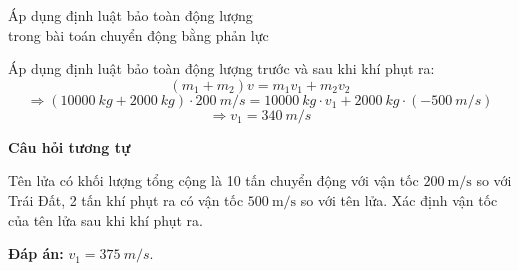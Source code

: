 \begin{dang}{Áp dụng định luật bảo toàn động lượng \\trong bài toán chuyển động bằng phản lực}
{		Áp dụng định luật bảo toàn động lượng trước và sau khi khí phụt ra:
		$$(m_1+m_2)v = m_1v_1 + m_2 v_2$$ $$\Rightarrow (\SI{10000}{kg} + \SI{2000}{kg}) \cdot \SI{200}{m/s} = \SI{10000}{kg} \cdot v_1 + \SI{2000}{kg} \cdot (\SI{-500}{m/s})$$ $$\Rightarrow v_1  =\SI{340}{m/s}$$
		
		\begin{center}
			\textbf{Câu hỏi tương tự}
		\end{center}
		
		Tên lửa có khối lượng tổng cộng là 10 tấn chuyển động với vận tốc $\SI{200}{\meter/\second}$ so với Trái Đất, 2 tấn khí phụt ra có vận tốc $\SI{500}{\meter/\second}$ so với tên lửa. Xác định vận tốc của tên lửa sau khi khí phụt ra.
		
		\textbf{Đáp án:} $v_1  =\SI{375}{m/s}$.
	}
\end{dang}

